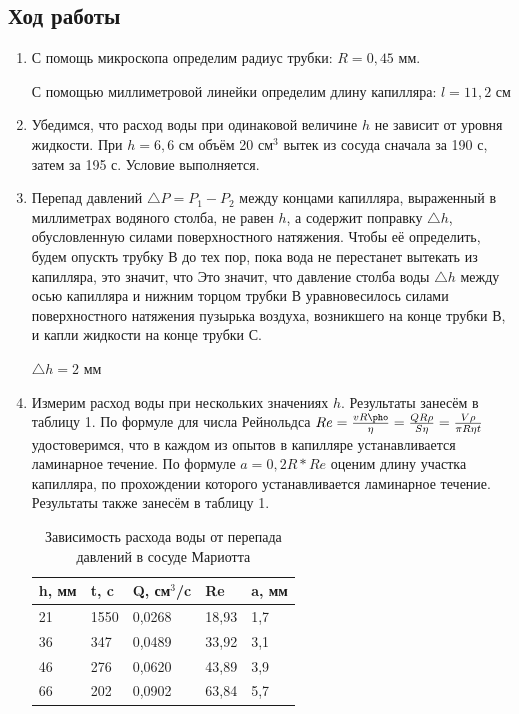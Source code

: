 \documentclass[a4paper]{article}
\begin{document}
\subsection{Ход работы}
\begin{enumerate}
    \item С помощь микроскопа определим радиус трубки: $R = 0,45$ мм. \par
    С помощью миллиметровой линейки определим длину капилляра: $l = 11,2$ см
    \item Убедимся, что расход воды при одинаковой величине $h$ не зависит от уровня жидкости. При $h = 6,6$ см объём 20 см$^3$ вытек из сосуда сначала за 190 с, затем за 195 с. Условие выполняется.
    \item Перепад давлений $\triangle P = P_1 - P_2$ между концами капилляра, выраженный в миллиметрах водяного столба, не равен $h$, а содержит поправку $\triangle h$, обусловленную силами поверхностного натяжения. Чтобы её определить, будем опускть трубку В до тех пор, пока вода не перестанет вытекать из капилляра, это значит, что Это значит, что давление столба воды $\triangle h$ между осью капилляра и нижним торцом трубки В уравновесилось силами поверхностного натяжения пузырька воздуха, возникшего на конце трубки В, и капли жидкости на конце трубки С.
    \begin{center}
    $\triangle h = 2$ мм
    \end{center}
    \item Измерим расход воды при нескольких значениях $h$. Результаты занесём в таблицу 1. По формуле для числа Рейнольдса $Re = \frac{vR \pho}{\eta} = \frac{QR \rho}{S \eta} = \frac{V\rho}{\pi R \eta t}$ удостоверимся, что в каждом из опытов в капилляре устанавливается ламинарное течение. По формуле $a = 0,2R * Re$ оценим длину участка капилляра, по прохождении которого устанавливается ламинарное течение. Результаты также занесём в таблицу 1.
    
    \begin{table}[h]
    \centering
    \begin{center}
    \caption{Зависимость расхода воды от перепада давлений в сосуде Мариотта}
    \end{center}
    \vspace{0.1cm}
    \label{tab:my_label}
    \begin{tabular}{ |p{1.5cm}|p{1.5cm}|p{1.5cm}|p{1.5cm}|p{1.5cm}|  }
    \hline
     h, мм & t, c & Q, см$^3$/c & Re & a, мм\\
    \hline 
     21 & 1550 & 0,0268  & 18,93 & 1,7 \\
     36 & 347  & 0,0489  & 33,92 & 3,1 \\
     46 & 276  & 0,0620  & 43,89 & 3,9 \\
     66 & 202  & 0,0902  & 63,84 & 5,7 \\
    \hline
    \end{tabular}
    \end{table}
    

\end{enumerate}
\end{document}
